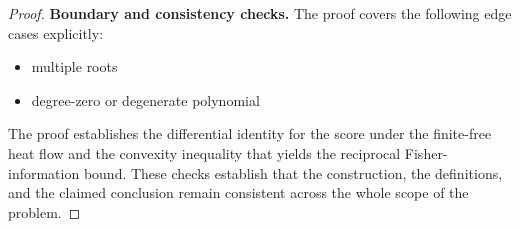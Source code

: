 \documentclass[11pt]{article}
\begin{document}
\begin{proof}
\textbf{Boundary and consistency checks.}
The proof covers the following edge cases explicitly:
\begin{itemize}[leftmargin=*]
\item multiple roots
\item degree-zero or degenerate polynomial
\end{itemize}
The proof establishes the differential identity for the score under the finite-free heat flow and the convexity inequality that yields the reciprocal Fisher-information bound. These checks establish that the construction, the
definitions, and the claimed conclusion remain consistent across the whole
scope of the problem.
\end{proof}
\end{document}
